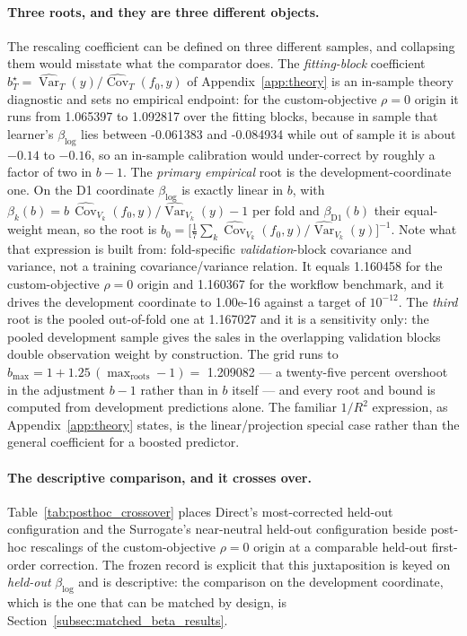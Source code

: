 \documentclass[10pt]{article}
\theoremstyle{definition}
\newcommand{\Cov}{\operatorname{Cov}}
\newcommand{\Var}{\operatorname{Var}}
\newcommand{\1}{\mathbf{1}}
\begin{document}
\paragraph{Three roots, and they are three different objects.}
The rescaling coefficient can be defined on three different samples, and collapsing them
would misstate what the comparator does. The \emph{fitting-block} coefficient
$b^{\star}_{T}=\widehat{\Var}_T(y)/\widehat{\Cov}_T(f_0,y)$ of Appendix~\ref{app:theory} is an
in-sample theory diagnostic and sets no empirical endpoint: for the custom-objective $\rho=0$ origin
it runs from 1.065397 to 1.092817 over the fitting blocks, because in sample that learner's
$\beta_{\log}$ lies between -0.061383 and -0.084934 while out of sample it is about
$-0.14$ to $-0.16$, so an in-sample calibration would under-correct by roughly a factor of two in $b-1$. The
\emph{primary empirical} root is the development-coordinate one. On the D1 coordinate
$\beta_{\log}$ is exactly linear in $b$, with
$\beta_k(b)=b\,\widehat{\Cov}_{V_k}(f_0,y)/\widehat{\Var}_{V_k}(y)-1$ per fold and
$\beta_{\mathrm{D1}}(b)$ their equal-weight mean, so the root is
$b_{0}=\bigl[\tfrac{1}{7}\sum_{k}\widehat{\Cov}_{V_k}(f_0,y)/\widehat{\Var}_{V_k}(y)\bigr]^{-1}$. Note what
that expression is built from: fold-specific \emph{validation}-block covariance and variance, not a
training covariance/variance relation. It equals 1.160458 for the custom-objective $\rho=0$
origin and 1.160367 for the workflow benchmark, and it drives the development coordinate to
1.00e-16 against a target of $10^{-12}$. The \emph{third} root is the pooled out-of-fold one at
1.167027 and it is a sensitivity only: the pooled development sample gives the sales in the
overlapping validation blocks double observation weight by construction. The grid runs to
$b_{\max}=1+1.25\,(\max_{\text{roots}}-1)=$ 1.209082 --- a twenty-five percent overshoot in the
adjustment $b-1$ rather than in $b$ itself --- and every root and bound is computed from development
predictions alone. The familiar $1/R^{2}$ expression, as Appendix~\ref{app:theory} states, is the
linear/projection special case rather than the general coefficient for a boosted predictor.

\paragraph{The descriptive comparison, and it crosses over.}
Table~\ref{tab:posthoc_crossover} places Direct's most-corrected held-out
configuration and the Surrogate's near-neutral held-out configuration beside post-hoc rescalings
of the custom-objective $\rho=0$ origin at a comparable held-out first-order correction. The frozen record is explicit that this juxtaposition is keyed on
\emph{held-out} $\beta_{\log}$ and is descriptive: the comparison on the development coordinate,
which is the one that can be matched by design, is
Section~\ref{subsec:matched_beta_results}.
\end{document}
